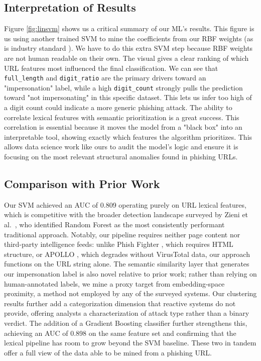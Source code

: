 \documentclass[conference]{IEEEtran}
\begin{document}
\subsection{Interpretation of Results}
Figure \ref{fig:linsvm} shows us a critical summary of our ML's results. This figure is us using another trained SVM to mine the coefficients from our RBF weights (as is industry standard \cite{liu_2011_f}). We have to do this extra SVM step because RBF weights are not human readable on their own. The visual gives a clear ranking of which URL features most influenced the final classification. We can see that \texttt{full\_length} and \texttt{digit\_ratio} are the primary drivers toward an "impersonation" label, while a high \texttt{digit\_count} strongly pulls the prediction toward "not impersonating" in this specific dataset. This lets us infer too high of a digit count could indicate a more generic phishing attack. The ability to correlate lexical features with semantic prioritization is a great success. This correlation is essential because it moves the model from a "black box" into an interpretable tool, showing exactly which features the algorithm prioritizes. This allows data science work like ours to audit the model's logic and ensure it is focusing on the most relevant structural anomalies found in phishing URLs.
\subsection{Comparison with Prior Work}
Our SVM achieved an AUC of 0.809 operating purely on URL lexical features, which is competitive with the broader detection landscape surveyed by Zieni et al.\ \cite{zieni_phishing_2023}, who identified Random Forest as the most consistently performant traditional approach. Notably, our pipeline requires neither page content nor third-party intelligence feeds: unlike Phish Fighter \cite{brezeanu_phish_2025}, which requires HTML structure, or APOLLO \cite{desolda_apollo_2025}, which degrades without VirusTotal data, our approach functions on the URL string alone. The semantic similarity layer that generates our impersonation label is also novel relative to prior work; rather than relying on human-annotated labels, we mine a proxy target from embedding-space proximity, a method not employed by any of the surveyed systems. Our clustering results further add a categorization dimension that reactive systems do not provide, offering analysts a characterization of attack type rather than a binary verdict. The addition of a Gradient Boosting classifier further strengthens this, achieving an AUC of 0.898 on the same feature set and confirming that the lexical pipeline has room to grow beyond the SVM baseline. These two in tandem offer a full view of the data able to be mined from a phishing URL.
\end{document}
